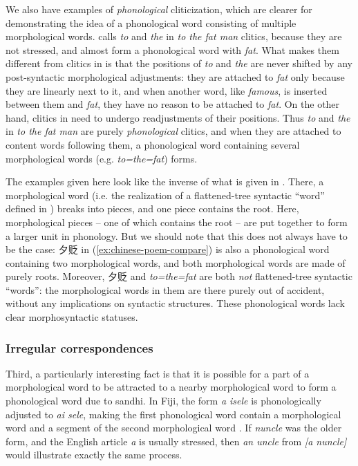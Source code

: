 \documentclass[a4paper, oneside, scheme=plain, 12pt]{article}
\newcommand*{\citepage}[1]{p.~{#1}}
\newcommand{\form}[1]{\emph{#1}}
\begin{document}
We also have examples of \emph{phonological} cliticization,
which are clearer for demonstrating the idea of a phonological word consisting of multiple morphological words.
\citet[\citepage{49}]{dixon2009basic1} calls \form{to} and \form{the} in \form{to the fat man} clitics,
because they are not stressed, and almost form a phonological word with \form{fat}.
What makes them different from clitics in 
is that the positions of \form{to} and \form{the} are never shifted by any post-syntactic morphological adjustments:
they are attached to \form{fat} only because they are linearly next to it,
and when another word, like \form{famous}, is inserted between them and \form{fat},
they have no reason to be attached to \form{fat}.
On the other hand, clitics in  need to undergo readjustments of their positions.
Thus \form{to} and \form{the} in \form{to the fat man} are purely \emph{phonological} clitics,
and when they are attached to content words following them,
a phonological word containing several morphological words (e.g. \form{to=the=fat}) forms.

The examples given here look like the inverse of what is given in .
There, a morphological word (i.e. the realization of a flattened-tree syntactic ``word'' defined in ) breaks into pieces,
and one piece contains the root.
Here, morphological pieces -- one of which contains the root -- are put together to form a larger unit in phonology.
But we should note that this does not always have to be the case:
夕贬 in (\ref{ex:chinese-poem-compare}) is also a phonological word containing two morphological words,
and both morphological words are made of purely roots.
Moreover, 夕贬 and \form{to=the=fat} are both \emph{not} flattened-tree syntactic ``words'':
the morphological words in them are there purely out of accident,
without any implications on syntactic structures.
These phonological words lack clear morphosyntactic statuses.

\subsubsection{Irregular correspondences}\label{sec:irregular-phonological-morphology-correspondence}

Third, a particularly interesting fact is that it is possible for a part of a morphological word
to be attracted to a nearby morphological word to form a phonological word due to sandhi.
In Fiji, the form \form{a isele} is phonologically adjusted to \form{ai sele},
making the first phonological word contain a morphological word and a segment of the second morphological word
\citep[\citepage{25}]{dixon2010basic2}.
If \form{nuncle} was the older form, and the English article \form{a} is usually stressed, then \form{an uncle} from \form{[a nuncle]} would illustrate exactly the same process.
\end{document}

